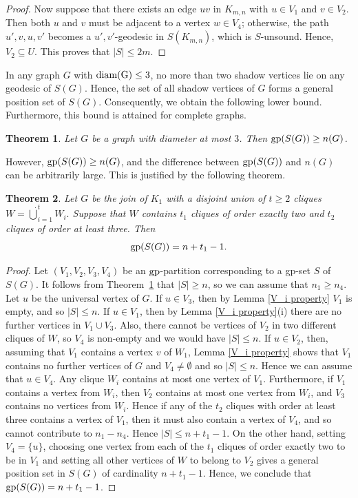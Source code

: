 \documentclass[a4paper,12pt]{article}
\newtheorem{theorem}{Theorem}[section]
\newcommand{\gp}{{\rm gp}}
\newcommand{\diam}{\rm diam}
\begin{document}
{\begin{proof}
Now suppose that there exists an edge $uv$ in $K_{m,n}$ with $u \in V_1$ and $v \in V_2$. Then both $u$ and $v$ must be adjacent to a vertex $w \in V_4$; otherwise, the path $u', v, u, v'$ becomes a $u',v'$-geodesic in $S(K_{m,n})$, which is $S$-unsound. Hence, $V_2 \subseteq U$. This proves that $|S| \leq 2m$.
\end{proof}

In any graph $G$ with $\diam(G) \leq 3$, no more than two shadow vertices lie on any geodesic of $S(G)$. Hence, the set of all shadow vertices of $G$ forms a general position set of $S(G)$. Consequently, we obtain the following lower bound. Furthermore, this bound is attained for complete graphs.

\begin{theorem}\label{diam<3}
    Let $G$ be a graph with diameter at most $3$. Then $ \gp(S(G)) \geq n(G) $.
\end{theorem}
However, $\gp(S(G)) \geq n(G)$, and the difference between $\gp(S(G))$ and $n(G)$ can be arbitrarily large. This is justified by the following theorem.

\begin{theorem}\label{thm:joinofK1withunionofcliques}
     Let $G$ be the join of $K_1$ with a disjoint union of $t \geq 2$ cliques 
$W =\dot{\bigcup}_{i=1}^{t} W_i.$
Suppose that $W$ contains $t_1$ cliques of order exactly two and $t_2$ cliques of order at least three. Then
\[
\gp(S(G)) = n + t_1-1.
\]

 \end{theorem}
	\begin{proof}
	    Let $(V_1,V_2,V_3,V_4)$ be an $\gp$-partition corresponding to a gp-set $S$ of $S(G)$. It follows from Theorem~\ref{diam<3} that $|S| \geq n$, so we can assume that $n_1\geq n_4$. Let $u$ be the universal vertex of $G$. If $u \in V_3$, then by Lemma \ref{V_i property} $V_1$ is empty, and so $|S| \leq n$. If $u \in V_1$, then by Lemma \ref{V_i property}(i) there are no further vertices in $V_1 \cup V_3$. Also, there cannot be vertices of $V_2$ in two different cliques of $W$, so $V_4$ is non-empty and we would have $|S| \leq n$. If $u \in V_2$, then, assuming that $V_1$ contains a vertex $v$ of $W_1$,  Lemma \ref{V_i property} shows that $V_1$ contains no further vertices of $G$ and $V_4 \neq \emptyset $ and so $|S| \leq n$. Hence we can assume that $u \in V_4$. Any clique $W_i$ contains at most one vertex of $V_1$. Furthermore, if $V_1$ contains a vertex from $W_i$, then $V_2$ contains at most one vertex from $W_i$, and $V_3$ contains no vertices from $W_i$. Hence if any of the $t_2$ cliques with order at least three contains a vertex of $V_1$, then it must also contain a vertex of $V_4$, and so cannot contribute to $n_1-n_4$. Hence $|S| \leq n+t_1-1$. On the other hand, setting $V_4 = \{ u\} $, choosing one vertex from each of the $t_1$ cliques of order exactly two to be in $V_1$ and setting all other vertices of $W$ to belong to $V_2$ gives a general position set in $S(G)$ of cardinality $n+t_1-1$. Hence, we conclude that $\gp (S(G)) = n+t_1-1$.
	\end{proof}


}
\end{document}
